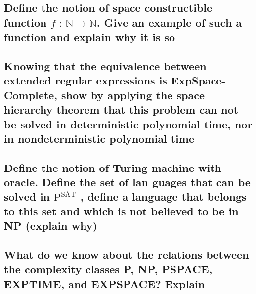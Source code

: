 \documentclass[main.tex]{subfiles}
\begin{document}
\subsection{Define the notion of space constructible function $f \text{ : } \mathbb{N} \rightarrow \mathbb{N}$. Give an example of such a function and explain why it is so}

\subsection{Knowing that the equivalence between extended regular expressions is ExpSpace-Complete, show by applying the space hierarchy theorem that this problem can not be solved in deterministic polynomial time, nor in nondeterministic polynomial time}

\subsection{Define the notion of Turing machine with oracle. Define the set of lan guages that can be solved in $\text{P}^\text{SAT}$ , define a language that belongs to this set and which is not believed to be in NP (explain why)}

\subsection{What do we know about the relations between the complexity classes P, NP, PSPACE, EXPTIME, and EXPSPACE? Explain}
\end{document}
